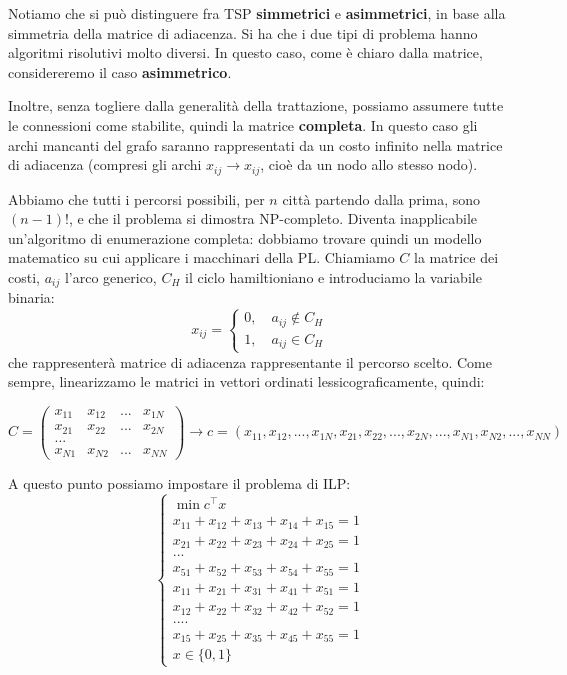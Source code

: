 \documentclass[a4paper,11pt]{article}
\begin{document}
Notiamo che si può distinguere fra TSP \textbf{simmetrici} e \textbf{asimmetrici}, in base alla simmetria della matrice di adiacenza.
Si ha che i due tipi di problema hanno algoritmi risolutivi molto diversi.
In questo caso, come è chiaro dalla matrice, considereremo il caso \textbf{asimmetrico}.

Inoltre, senza togliere dalla generalità della trattazione, possiamo assumere tutte le connessioni come stabilite, quindi la matrice \textbf{completa}. In questo caso gli archi mancanti del grafo saranno rappresentati da un costo infinito nella matrice di adiacenza (compresi gli archi $x_{ij} \rightarrow x_{ij}$, cioè da un nodo allo stesso nodo).

Abbiamo che tutti i percorsi possibili, per $n$ città partendo dalla prima, sono $(n-1)!$, e che il problema si dimostra NP-completo. 
Diventa inapplicabile un'algoritmo di enumerazione completa: dobbiamo trovare quindi un modello matematico su cui applicare i macchinari della PL.
Chiamiamo $C$ la matrice dei costi, $a_{ij}$ l'arco generico, $C_H$ il ciclo hamiltioniano e introduciamo la variabile binaria:
$$
x_{ij} =
	\begin{cases}
		0, \quad a_{ij} \notin C_H \\
		1, \quad a_{ij} \in C_H
	\end{cases}
$$
che rappresenterà matrice di adiacenza rappresentante il percorso scelto.
Come sempre, linearizzamo le matrici in vettori ordinati lessicograficamente, quindi:

$$ C = \begin{pmatrix}
	x_{11} & x_{12} & ... & x_{1N} \\ 
	x_{21} & x_{22} & ... & x_{2N} \\ 
	... \\ 
	x_{N1} & x_{N2} & ... & x_{NN}
\end{pmatrix} \rightarrow c = (x_{11}, x_{12}, ..., x_{1N}, x_{21}, x_{22}, ..., x_{2N}, ..., x_{N1}, x_{N2}, ..., x_{NN}) $$

A questo punto possiamo impostare il problema di ILP:
\[
	\begin{cases}
		\min c^\intercal x \\ 
		x_{11} + x_{12} + x_{13} + x_{14} + x_{15} = 1 \\ 
		x_{21} + x_{22} + x_{23} + x_{24} + x_{25} = 1 \\ 
		... \\ 
		x_{51} + x_{52} + x_{53} + x_{54} + x_{55} = 1 \\ 
		x_{11} + x_{21} + x_{31} + x_{41} + x_{51} = 1 \\ 
		x_{12} + x_{22} + x_{32} + x_{42} + x_{52} = 1 \\ 
		.... \\
		x_{15} + x_{25} + x_{35} + x_{45} + x_{55} = 1 \\ 
		x \in \{ 0, 1 \}
	\end{cases}
\]
\end{document}
